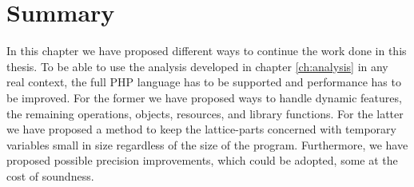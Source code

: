 \section{Summary}
In this chapter we have proposed different ways to continue the work done in this thesis. To be able to use the analysis developed in chapter \ref{ch:analysis} in any real context, the full PHP language has to be supported and performance has to be improved. For the former we have proposed ways to handle dynamic features, the remaining operations, objects, resources, and library functions. For the latter we have proposed a method to keep the lattice-parts concerned with temporary variables small in size regardless of the size of the program. Furthermore, we have proposed possible precision improvements, which could be adopted, some at the cost of soundness.